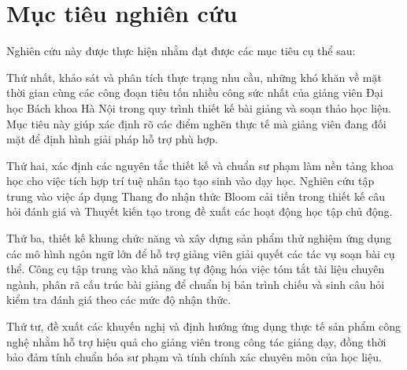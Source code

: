 \section{Mục tiêu nghiên cứu}

Nghiên cứu này được thực hiện nhằm đạt được các mục tiêu cụ thể sau:

Thứ nhất, khảo sát và phân tích thực trạng nhu cầu, những khó khăn về mặt thời gian cùng các công đoạn tiêu tốn nhiều công sức nhất của giảng viên Đại học Bách khoa Hà Nội trong quy trình thiết kế bài giảng và soạn thảo học liệu. Mục tiêu này giúp xác định rõ các điểm nghẽn thực tế mà giảng viên đang đối mặt để định hình giải pháp hỗ trợ phù hợp.

Thứ hai, xác định các nguyên tắc thiết kế và chuẩn sư phạm làm nền tảng khoa học cho việc tích hợp trí tuệ nhân tạo tạo sinh vào dạy học. Nghiên cứu tập trung vào việc áp dụng Thang đo nhận thức Bloom cải tiến trong thiết kế câu hỏi đánh giá và Thuyết kiến tạo trong đề xuất các hoạt động học tập chủ động.

Thứ ba, thiết kế khung chức năng và xây dựng sản phẩm thử nghiệm ứng dụng các mô hình ngôn ngữ lớn để hỗ trợ giảng viên giải quyết các tác vụ soạn bài cụ thể. Công cụ tập trung vào khả năng tự động hóa việc tóm tắt tài liệu chuyên ngành, phân rã cấu trúc bài giảng để chuẩn bị bản trình chiếu và sinh câu hỏi kiểm tra đánh giá theo các mức độ nhận thức.

Thứ tư, đề xuất các khuyến nghị và định hướng ứng dụng thực tế sản phẩm công nghệ nhằm hỗ trợ hiệu quả cho giảng viên trong công tác giảng dạy, đồng thời bảo đảm tính chuẩn hóa sư phạm và tính chính xác chuyên môn của học liệu.
